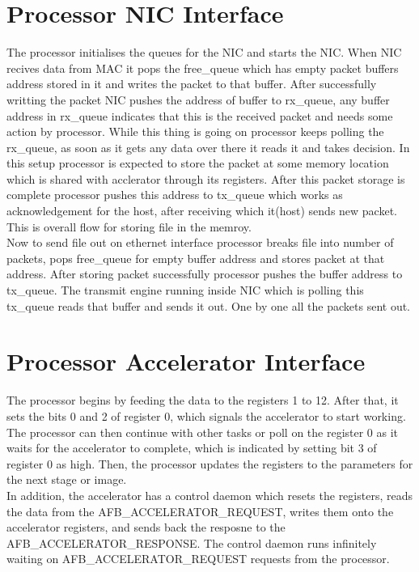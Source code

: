 \documentclass[a4paper,12pt, final]{report}
\begin{document}
\section{Processor NIC Interface}

The processor initialises the queues for the NIC and starts the NIC. When NIC recives data from MAC it pops the free\_queue which has empty packet buffers address stored in it and writes the packet to that buffer. After successfully writting the packet NIC pushes the address of buffer to rx\_queue, any buffer address in rx\_queue indicates that this is the received packet and needs some action by processor. While this thing is going on processor keeps polling the rx\_queue, as soon as it gets any data over there it reads it and takes decision. In this setup processor is expected to store the packet at some memory location which is shared with acclerator through its registers. After this packet storage is complete processor pushes this address to tx\_queue which works as acknowledgement for the host, after receiving which it(host) sends new packet. This is overall flow for storing file in the memroy.
\\

Now to send file out on ethernet interface processor breaks file into number of packets, pops free\_queue for empty buffer address and stores packet at that address. After storing packet successfully processor pushes the buffer address to tx\_queue. The transmit engine running inside NIC which is polling this tx\_queue reads that buffer and sends it out. One by one all the packets sent out.


\section{Processor Accelerator Interface}

The processor begins by feeding the data to the registers 1 to 12. After that, it sets the bits 0 and 2 of register 0, which signals the accelerator to start working. The processor can then continue with other tasks or poll on the register 0 as it waits for the accelerator to complete, which is indicated by setting bit 3 of register 0 as high. Then, the processor updates the registers to the parameters for the next stage or image.
\\

In addition, the accelerator has a control daemon which resets the registers, reads the data from the AFB\_ACCELERATOR\_REQUEST, writes them onto the accelerator registers, and sends back the resposne to the AFB\_ACCELERATOR\_RESPONSE. The control daemon runs infinitely waiting on AFB\_ACCELERATOR\_REQUEST requests from the processor.
\\
\end{document}
